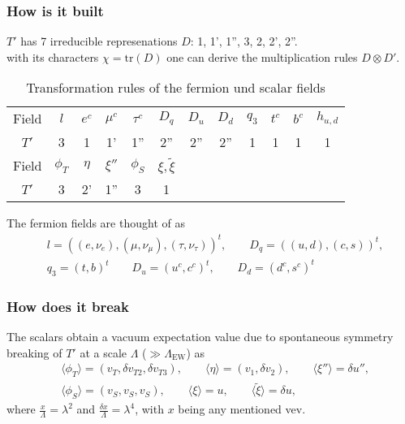 \documentclass[hyperref={pdfpagelabels=false}]{beamer}
\begin{document}
\begin{frame}
 \frametitle{How is it built}
 $T'$ has 7 irreducible represenations $D$: 1, 1', 1'', 3, 2, 2', 2''.\\
 with its characters $\chi = \text{tr}(D)$ one can derive the multiplication rules $D\otimes D'$.
 \begin{table}[l]
  \begin{tabular}{c|ccccccccccc}
   Field&$l$&$e^c$&$\mu^c$&$\tau^c$&$D_q$&$D_u$&$D_d$&$q_3$&$t^c$&$b^c$&$h_{u,d}$\\
   $T'$& 3 & 1 & 1' & 1'' & 2'' & 2'' & 2'' & 1 & 1 & 1&1\\
   \hline
   Field&$\phi_T$&$\eta$&$\xi''$&$\phi_S$&$\xi,\tilde{\xi}$\\
   $T'$ & 3 & 2' & 1'' & 3 & 1
  \end{tabular}
  \caption{Transformation rules of the fermion und scalar fields}
 \end{table}
The fermion fields are thought of as
\begin{align*}
 &l = ((e,\nu_e),(\mu,\nu_\mu),(\tau,\nu_\tau))^t,\qquad D_q = ((u,d),(c,s))^t,\\ 
 &q_3 = (t,b)^t \qquad D_u = (u^c,c^c)^t, \qquad D_d = (d^c,s^c)^t
\end{align*}



\end{frame}

\begin{frame}
 \frametitle{How does it break}
 The scalars obtain a vacuum expectation value due to spontaneous symmetry breaking of $T'$ at a scale $\Lambda$ ($\gg \Lambda_\text{EW}$) as
 \begin{align*}
  &\langle\phi_T\rangle = (v_T,\delta v_{T2}, \delta v_{T3}),\qquad \langle\eta\rangle = (v_1,\delta v_2), \qquad \langle\xi''\rangle = \delta u'',\\
  &\langle\phi_S\rangle = (v_S, v_S, v_S), \qquad \langle\xi\rangle = u, \qquad \langle\tilde{\xi}\rangle = \delta u,
 \end{align*}
where $\frac{x}{\Lambda} = \lambda^2$ and $\frac{\delta x}{\Lambda} = \lambda^4$, with $x$ being any mentioned vev.
\end{frame}
\end{document}
